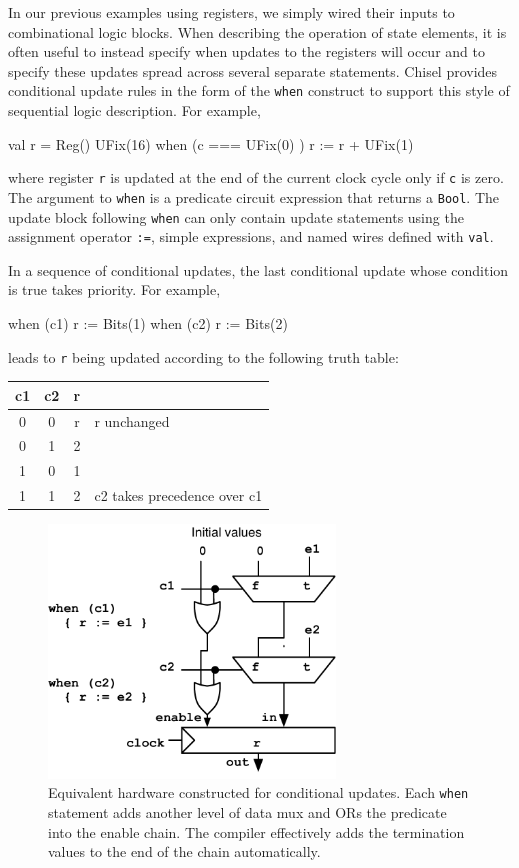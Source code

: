 \documentclass[twocolumn,10pt]{article}
\def\code#1{{\tt #1}}
\begin{document}
In our previous examples using registers, we simply wired their inputs
to combinational logic blocks.  When describing the operation of state
elements, it is often useful to instead specify when updates to the
registers will occur and to specify these updates spread across
several separate statements.  Chisel provides conditional update rules
in the form of the \code{when} construct to support this style of
sequential logic description. For example,
\begin{scala}
val r = Reg() { UFix(16) }
when (c === UFix(0) ) {
  r := r + UFix(1)
}
\end{scala}

\noindent
where register \code{r} is updated at the end of the current clock
cycle only if \verb+c+ is zero.  The argument to \code{when} is a
predicate circuit expression that returns a \code{Bool}.  The update
block following \code{when} can only contain update statements using
the assignment operator \verb+:=+, simple expressions, and named wires
defined with \code{val}.

In a sequence of conditional updates, the last conditional update
whose condition is true takes priority.  For example,
\begin{scala}
when (c1) { r := Bits(1) }
when (c2) { r := Bits(2) }
\end{scala}

\noindent
leads to \code{r} being updated according to the following truth table:
\begin{center}
{\small
\begin{tabular}{|c|c|c|l|}
\hline
c1 & c2  &  r & \\
\hline
0 &  0 & r &  r unchanged \\
0 &  1 & 2 & \\
1 &  0 & 1 & \\
1 &  1 & 2& c2 takes precedence over c1 \\
\hline
\end{tabular}
}
\end{center}

\begin{figure}[h]
\centering
\includegraphics[width=3in]{figs/condupdates.pdf}
\caption{Equivalent hardware constructed for conditional updates.
  Each \code{when} statement adds another level of data mux and ORs
  the predicate into the enable chain.  The compiler effectively adds
  the termination values to the end of the chain automatically.}
\label{fig:condupdates}
\end{figure}
\end{document}
